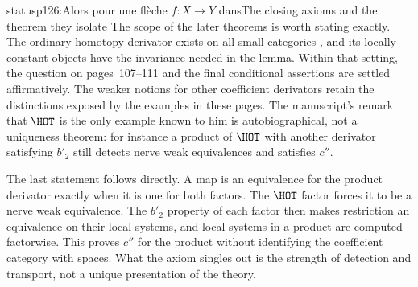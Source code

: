 \begin{dcomment}{status}{p126:Alors pour une flèche $f : X \to Y$ dans}{The closing axioms and the theorem they isolate}
The scope of the later theorems is worth stating exactly. The ordinary homotopy derivator exists on all small categories \citep[Theorem~6.11]{Cisinski2003}, and its locally constant objects have the invariance needed in the lemma. Within that setting, the question on pages~107--111 and the final conditional assertions are settled affirmatively. The weaker notions for other coefficient derivators retain the distinctions exposed by the examples in these pages. The manuscript's remark that $\HOT$ is the only example known to him is autobiographical, not a uniqueness theorem: for instance a product of $\HOT$ with another derivator satisfying $b'_2$ still detects nerve weak equivalences and satisfies $c''$.

The last statement follows directly. A map is an equivalence for the product derivator exactly when it is one for both factors. The $\HOT$ factor forces it to be a nerve weak equivalence. The $b'_2$ property of each factor then makes restriction an equivalence on their local systems, and local systems in a product are computed factorwise. This proves $c''$ for the product without identifying the coefficient category with spaces. What the axiom singles out is the strength of detection and transport, not a unique presentation of the theory.
\end{dcomment}


